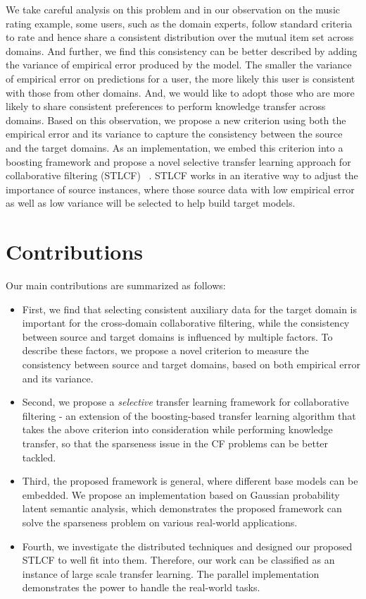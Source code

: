 We take careful analysis on this problem and in our observation on the music rating example, some users, such as the domain experts, follow standard criteria to rate and hence share a consistent distribution over the mutual item set across domains. And further, we find this consistency can be better described by adding the variance of empirical error produced by the model. The smaller the variance of empirical error on predictions for a user, the more likely this user is consistent with those from other domains. And, we would like to adopt those who are more likely to share consistent preferences to perform knowledge transfer across domains.
Based on this observation, we propose a new criterion using both the empirical error and its variance to capture the consistency between the source and the target domains. As an implementation, we embed this criterion into a boosting framework and propose a novel selective transfer learning approach for collaborative filtering (STLCF) ~\cite{zhongqi2013selective}.
STLCF works in an iterative way to adjust the importance of source instances, where those source data with low empirical error as well as low variance will be selected to help build target models.

\hspace{0.1in}
\section{Contributions}

Our main contributions are summarized as follows:

\begin{itemize}[noitemsep,topsep=0pt,parsep=0pt,partopsep=0pt]
\item First, we find that selecting consistent auxiliary data for the target domain is important for the cross-domain collaborative filtering, while the consistency between source and target domains is influenced by multiple factors. To describe these factors, we propose a novel  criterion to measure the consistency between source and target domains, based on both empirical error and its variance.
\item Second, we propose a {\em selective} transfer learning framework for collaborative filtering - an extension of the boosting-based transfer learning algorithm that takes the above criterion into consideration while performing knowledge transfer, so that the sparseness issue in the CF problems can be better tackled.
\item Third, the proposed framework is general, where different base models can be embedded. We propose an implementation based on Gaussian probability latent semantic analysis, which demonstrates the proposed framework can solve the sparseness problem on various real-world applications.
\item Fourth, we investigate the distributed techniques and designed our proposed STLCF to well fit into them. Therefore, our work can be classified as an instance of large scale transfer learning. The parallel implementation demonstrates the power to handle the real-world tasks.
\end{itemize}


